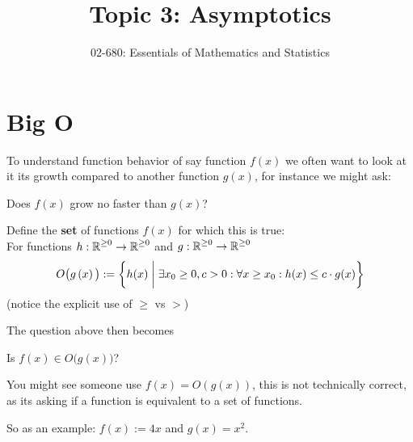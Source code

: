 


\title{Topic 3: Asymptotics}
\author{02-680: Essentials of Mathematics and Statistics}


\maketitle

 \section{Big O}
 To understand function behavior of say function $f(x)$ we often want to look at it its growth compared to another function $g(x)$,
 for instance we might ask:
 \begin{tcolorbox}
 \centering
 Does $f(x)$ grow no faster than $g(x)$?
 \end{tcolorbox}
 
 Define the \textbf{set} of functions $f(x)$ for which this is true: \\
 For functions $h: \operatorname{\mathbb{R}}^{\ge 0} \rightarrow \operatorname{\mathbb{R}}^{\ge 0}$ and $g: \operatorname{\mathbb{R}}^{\ge 0} \rightarrow \operatorname{\mathbb{R}}^{\ge 0}$
\[
O\big(g\left(x\right)\big) := \bigg\{h(x) \biggm| \exists x_0 \ge 0, c > 0 : \forall x \ge x_0 : h(x) \le c \cdot g(x) \bigg\}
\]
 (notice the explicit use of $\ge$ vs $>$)

The question above then becomes 
\begin{tcolorbox}
\centering
Is $f(x) \in O\big(g(x)\big)$?
\end{tcolorbox}

\begin{aside}
You might see someone use $f(x) = O(g(x))$, this is not technically correct, as its asking if a function is 
equivalent to a set of functions. 
\end{aside}

So as an example: $f(x) := 4x$ and $g(x)=x^2$. 

\begin{center}
\end{center}


